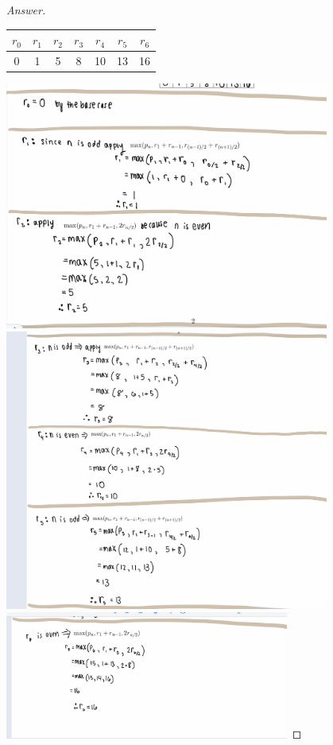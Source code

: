 \documentclass[11pt]{article}
\theoremstyle{definition}
\theoremstyle{definition}
\theoremstyle{definition}
\begin{document}
\begin{proof}[Answer]
\begin{center}
	\begin{tabular}{|c|c|c|c|c|c|c|}
	\hline
	$r_0$ & $r_{1}$ & $r_{2}$ & $r_{3}$ & $r_{4}$ & $r_{5}$ & $r_{6}$ \\ \hline
        0& 1& 5& 8& 10& 13& 16 \\ \hline
	\end{tabular}
\end{center}



\includegraphics[width=0.8\textwidth]{q213}\\
\includegraphics[width=0.8\textwidth]{q212}\\
\includegraphics[width=0.7\textwidth]{q211}
\end{proof}

\end{document}
